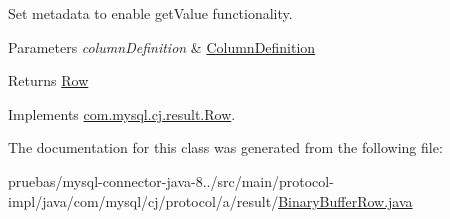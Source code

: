 Set metadata to enable get\+Value functionality.


\begin{DoxyParams}{Parameters}
{\em column\+Definition} & \mbox{\hyperlink{interfacecom_1_1mysql_1_1cj_1_1protocol_1_1_column_definition}{Column\+Definition}} \\
\hline
\end{DoxyParams}
\begin{DoxyReturn}{Returns}
\mbox{\hyperlink{}{Row}} 
\end{DoxyReturn}


Implements \mbox{\hyperlink{interfacecom_1_1mysql_1_1cj_1_1result_1_1_row_ab80b0f47123d2771840acead9bc094d0}{com.\+mysql.\+cj.\+result.\+Row}}.



The documentation for this class was generated from the following file\+:\begin{DoxyCompactItemize}
\item 
pruebas/mysql-\/connector-\/java-\/8../src/main/protocol-\/impl/java/com/mysql/cj/protocol/a/result/\mbox{\hyperlink{_binary_buffer_row_8java}{Binary\+Buffer\+Row.\+java}}\end{DoxyCompactItemize}
